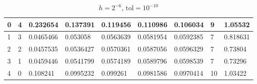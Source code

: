\documentclass{article} %
\theoremstyle{plain}
\numberwithin{equation}{section} %
\numberwithin{figure}{section} %
\numberwithin{table}{section} %
\begin{document}
\begin{table}[ht!]
\begin{tabular}{||l|l|||l|l|l|l|l||l||l||}
      0 &      4 & 0.232654  & 0.137391  & 0.119456  & 0.110986  & 0.106034  &     9 & 1.05532  \\\hline
      1 &      3 & 0.0465466 & {\color{red}0.053058}  & {\color{red}0.0563639} & {\color{red}0.0581954} & {\color{red}0.0592385} &     {\color{red}7} & 0.818631 \\\hline
      2 &      2 & {\color{red}0.0457535} & 0.0536427 & 0.0570361 & 0.0587056 & 0.0596329 &     {\color{red}7} & 0.73804  \\\hline
      3 &      1 & 0.0459446 & 0.0541799 & 0.0574189 & 0.0589796 & 0.0598539 &     {\color{red}7} & {\color{red}0.73296}  \\\hline
      4 &      0 & 0.108241  & 0.0995232 & 0.099261  & 0.0981586 & 0.0970414 &    10 & 1.03422  \\\hline\hline\hline
\end{tabular}
\caption*{$h=2^{-6}$, $\text{tol}=10^{-10}$}
\end{table}
\end{document}
